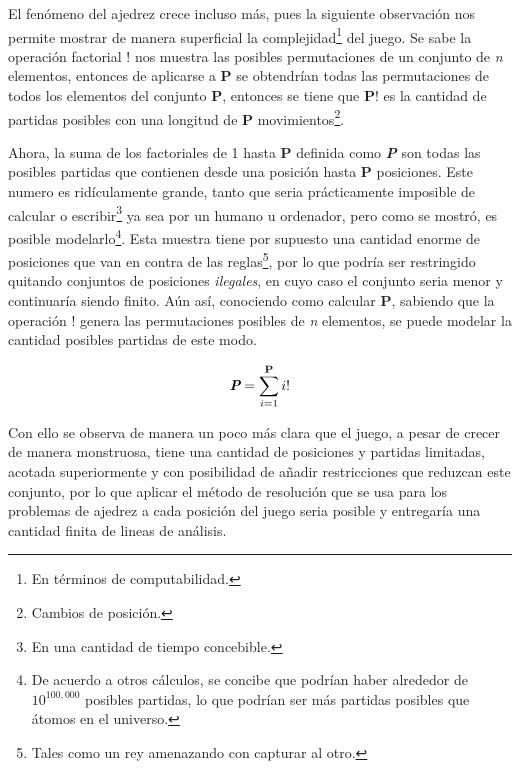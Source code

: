 \documentclass[twoside,openright,12pt,a4paper,spanish]{book}
\begin{document}
El fenómeno del ajedrez crece incluso más, pues la siguiente observación nos permite mostrar de manera superficial la complejidad\footnote{En términos de computabilidad.} del juego. Se sabe la operación factorial $!$ nos muestra las posibles permutaciones de un conjunto de \textit{n} elementos, entonces de aplicarse a \textbf{P} se obtendrían todas las permutaciones de todos los elementos del conjunto \textbf{P}, entonces se tiene que $\textbf{P}!$ es la cantidad de partidas posibles con una longitud de \textbf{P} movimientos\footnote{Cambios de posición.}.

Ahora, la suma de los factoriales de 1 hasta \textbf{P} definida como \textbf{\textit{P}} son todas las posibles partidas que contienen desde una posición hasta \textbf{P} posiciones. Este numero es ridículamente grande, tanto que seria prácticamente imposible de calcular o escribir\footnote{En una cantidad de tiempo concebible.} ya sea por un humano u ordenador, pero como se mostró, es posible modelarlo\footnote{De acuerdo a otros cálculos, se concibe que podrían haber alrededor de $10^{100,000}$ posibles partidas, lo que podrían ser más partidas posibles que átomos en el universo.}. Esta muestra tiene por supuesto una cantidad enorme de posiciones que van en contra de las reglas\footnote{Tales como un rey amenazando con capturar al otro.}, por lo que podría ser restringido quitando conjuntos de posiciones \textit{ilegales}, en cuyo caso el conjunto seria menor y continuaría siendo finito. Aún así, conociendo como calcular \textbf{P}, sabiendo que la operación $!$ genera las permutaciones posibles de \textit{n} elementos, se puede modelar la cantidad posibles partidas de este modo.

\[\textit{\textbf{P}}=\sum_{i=1}^{\textbf{P}}i!\]

Con ello se observa de manera un poco más clara que el juego, a pesar de crecer de manera monstruosa, tiene una cantidad de posiciones y partidas limitadas, acotada superiormente y con posibilidad de añadir restricciones que reduzcan este conjunto, por lo que aplicar el método de resolución que se usa para los problemas de ajedrez a cada posición del juego seria posible y entregaría una cantidad finita de lineas de análisis.
\end{document}
